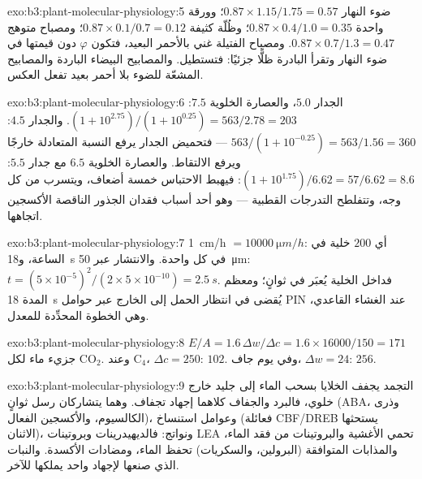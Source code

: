 \begin{solution}{exo:b3:plant-molecular-physiology:5}
ضوء النهار $0.87\times 1.15/1.75 = 0.57$؛ وورقة واحدة $0.87\times 0.4/1.0 =
0.35$؛ وظُلّة كثيفة $0.87\times 0.1/0.7 = 0.12$؛ ومصباح متوهج
$0.87\times 0.7/1.3 = 0.47$. ومصباح الفتيلة غني بالأحمر البعيد،
فتكون $\varphi$ دون قيمتها في ضوء النهار وتقرأ البادرة ظلًّا
جزئيًا: فتستطيل. والمصابيح البيضاء الباردة والمصابيح
المشعّة للضوء بلا أحمر بعيد تفعل العكس.
\end{solution}

\begin{solution}{exo:b3:plant-molecular-physiology:6}
الجدار $5.0$، والعصارة الخلوية $7.5$: $(1 + 10^{2.75})/(1 + 10^{0.25}) = 563/2.78
= 203$. والجدار $4.5$: $563/(1 + 10^{-0.25}) = 563/1.56 = 360$ ---
فتحميض الجدار يرفع النسبة المتعادلة خارجًا ويرفع الالتقاط.
والعصارة الخلوية $6.5$ مع جدار $5.5$: $(1 + 10^{1.75})/6.62 = 57/6.62 = 8.6$:
فيهبط الاحتباس خمسة أضعاف، ويتسرب  من كل وجه،
وتتفلطح التدرجات القطبية --- وهو أحد أسباب فقدان الجذور
الناقصة الأكسجين اتجاهها.
\end{solution}

\begin{solution}{exo:b3:plant-molecular-physiology:7}
\qty{1}{cm/h} $= \qty{10000}{\micro m/h}$: أي $200$ خلية في الساعة،
و\qty{18}{s} في كل واحدة. والانتشار عبر \qty{50}{\micro m}: $t =
(5\times 10^{-5})^{2}/(2\times 5\times 10^{-10}) = \qty{2.5}{s}$.
فداخل الخلية يُعبَر في ثوانٍ؛ ومعظم المدة \qty{18}{s} يُقضى في
انتظار الحمل إلى الخارج عبر حوامل PIN عند الغشاء القاعدي،
وهي الخطوة المحدِّدة للمعدل.
\end{solution}

\begin{solution}{exo:b3:plant-molecular-physiology:8}
$E/A = 1.6\,\Delta w/\Delta c = 1.6\times\num{16000}/150 = 171$ جزيء ماء
لكل CO$_{2}$. وعند C$_{4}$، $\Delta c = 250$: $102$. وفي يوم جاف،
$\Delta w = 24$: $256$.
\end{solution}

\begin{solution}{exo:b3:plant-molecular-physiology:9}
التجمد يجفف الخلايا بسحب الماء إلى جليد خارج خلوي، فالبرد
والجفاف كلاهما إجهاد تجفاف. وهما يتشاركان رسل ثوانٍ (ABA،
وذرى الكالسيوم، والأكسجين الفعال)، وعوامل استنساخ (فعائلة
CBF/DREB يستحثها الاثنان)، ونواتج: فالديهيدرينات وبروتينات
LEA تحمي الأغشية والبروتينات من فقد الماء، والمذابات
المتوافقة (البرولين، والسكريات) تحفظ الماء، ومضادات الأكسدة.
والنبات الذي صنعها لإجهاد واحد يملكها للآخر.
\end{solution}

